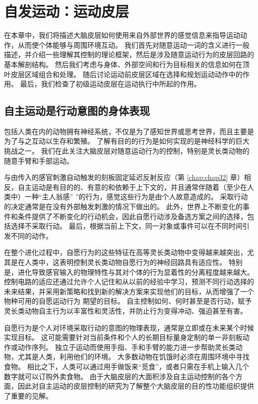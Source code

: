\chapter{自发运动：运动皮层} \label{chap:chap34}
在本章中，我们将描述大脑皮层如何使用来自外部世界的感觉信息来指导运动动作，从而使个体能够与周围环境互动。 我们首先对随意运动一词的含义进行一般描述，并介绍一些理解其控制的理论框架，然后是涉及随意运动行为的皮层回路的基本解剖结构。 然后我们考虑与身体、外部空间和行为目标相关的信息如何在顶叶皮层区域组合和处理。 随后讨论运动前皮层区域在选择和规划运动动作中的作用。 最后，我们检查了初级运动皮层在运动执行中所起的作用。

\section{自主运动是行动意图的身体表现}
包括人类在内的动物拥有神经系统，不仅是为了感知世界或思考世界，而且主要是为了与之互动以生存和繁殖。 了解有目的的行为是如何实现的是神经科学的巨大挑战之一。 我们在此关注大脑皮层对随意运动行为的控制，特别是灵长类动物的随意手臂和手部运动。

与由传入的感官刺激自动触发的刻板固定延迟反射反应（第 \ref{chap:chap32} 章）相反，自主运动是有目的的、有意的和依赖于上下文的，并且通常伴随着（至少在人类中）一种“主人翁感” ”的行为，感觉这些行为是由个人故意造成的。 采取行动的决定通常是在没有外部触发刺激的情况下做出的。 此外，世界上不断变化的事件和条件提供了不断变化的行动机会，因此自愿行动涉及备选方案之间的选择，包括选择不采取行动。 最后，根据当前上下文，同一对象或事件可以在不同时间引发不同的动作。

在整个进化过程中，自愿行为的这些特征在高等灵长类动物中变得越来越突出，尤其是在人类中，这表明控制灵长类动物自愿行为的神经回路具有适应性。 特别是，进化导致感官输入的物理特性与其对个体的行为显着性的分离程度越来越大。 控制电路的适应还通过允许个人记住和从以前的经验中学习，预测不同行动选择的未来结果，并采用新策略和找到新的解决方案来实现他们的目标，从而增强了一个物种可用的自愿运动行为 期望的目标。 自主控制如何、何时甚至是否行动，赋予灵长类动物自主行为以丰富性和灵活性，并防止行为变得冲动、强迫甚至有害。

自愿行为是个人对环境采取行动的意图的物理表现，通常是立即或在未来某个时候实现目标。 这可能需要针对当前条件和个人的长期目标量身定制的单一非刻板动作或动作序列。 独立于运动而使用手指、手和手臂的能力进一步帮助灵长类动物，尤其是人类，利用他们的环境。 大多数动物在饥饿时必须在周围环境中寻找食物。 相比之下，人类可以通过用手做饭来“觅食”，或者只需在手机上输入几个数字就可以订购外卖食物。 由于大脑皮层的大面积涉及自主运动控制的各个方面，因此对自主运动的皮层控制的研究为了解整个大脑皮层的目的性功能组织提供了重要的见解。


